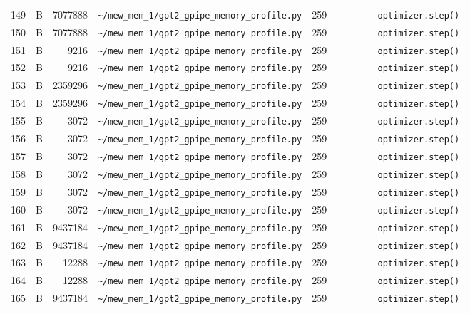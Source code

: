 \documentclass{article}
\begin{document}
\begin{longtable}{r l r p{6.5cm} r p{7.0cm}}
149 & B & 7077888 & \lstinline|~/mew_mem_1/gpt2_gpipe_memory_profile.py| & 259 & \lstinline|        optimizer.step()| \\
150 & B & 7077888 & \lstinline|~/mew_mem_1/gpt2_gpipe_memory_profile.py| & 259 & \lstinline|        optimizer.step()| \\
151 & B & 9216 & \lstinline|~/mew_mem_1/gpt2_gpipe_memory_profile.py| & 259 & \lstinline|        optimizer.step()| \\
152 & B & 9216 & \lstinline|~/mew_mem_1/gpt2_gpipe_memory_profile.py| & 259 & \lstinline|        optimizer.step()| \\
153 & B & 2359296 & \lstinline|~/mew_mem_1/gpt2_gpipe_memory_profile.py| & 259 & \lstinline|        optimizer.step()| \\
154 & B & 2359296 & \lstinline|~/mew_mem_1/gpt2_gpipe_memory_profile.py| & 259 & \lstinline|        optimizer.step()| \\
155 & B & 3072 & \lstinline|~/mew_mem_1/gpt2_gpipe_memory_profile.py| & 259 & \lstinline|        optimizer.step()| \\
156 & B & 3072 & \lstinline|~/mew_mem_1/gpt2_gpipe_memory_profile.py| & 259 & \lstinline|        optimizer.step()| \\
157 & B & 3072 & \lstinline|~/mew_mem_1/gpt2_gpipe_memory_profile.py| & 259 & \lstinline|        optimizer.step()| \\
158 & B & 3072 & \lstinline|~/mew_mem_1/gpt2_gpipe_memory_profile.py| & 259 & \lstinline|        optimizer.step()| \\
159 & B & 3072 & \lstinline|~/mew_mem_1/gpt2_gpipe_memory_profile.py| & 259 & \lstinline|        optimizer.step()| \\
160 & B & 3072 & \lstinline|~/mew_mem_1/gpt2_gpipe_memory_profile.py| & 259 & \lstinline|        optimizer.step()| \\
161 & B & 9437184 & \lstinline|~/mew_mem_1/gpt2_gpipe_memory_profile.py| & 259 & \lstinline|        optimizer.step()| \\
162 & B & 9437184 & \lstinline|~/mew_mem_1/gpt2_gpipe_memory_profile.py| & 259 & \lstinline|        optimizer.step()| \\
163 & B & 12288 & \lstinline|~/mew_mem_1/gpt2_gpipe_memory_profile.py| & 259 & \lstinline|        optimizer.step()| \\
164 & B & 12288 & \lstinline|~/mew_mem_1/gpt2_gpipe_memory_profile.py| & 259 & \lstinline|        optimizer.step()| \\
165 & B & 9437184 & \lstinline|~/mew_mem_1/gpt2_gpipe_memory_profile.py| & 259 & \lstinline|        optimizer.step()| \\

\end{longtable}
\end{document}
